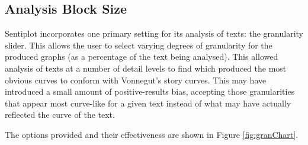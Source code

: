 \documentclass{article}
\begin{document}
{    \subsection{Analysis Block Size}
    \label{subsec:blockSize}
        Sentiplot incorporates one primary setting for its analysis of texts: the granularity slider. This allows the user to select varying degrees of granularity for the produced graphs (as a percentage of the text being analysed). This allowed analysis of texts at a number of detail levels to find which produced the most obvious curves to conform with Vonnegut's story curves. This may have introduced a small amount of positive-results bias, accepting those granularities that appear most curve-like for a given text instead of what may have actually reflected the curve of the text.

        The options provided and their effectiveness are shown in Figure \ref{fig:granChart}.
        
}
\end{document}
